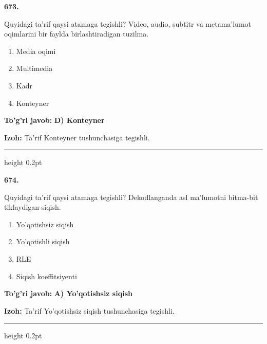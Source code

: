 \documentclass[10pt,a4paper,oneside]{article}
\begin{document}
\noindent\textbf{\color{ink}673.}
\par
Quyidagi ta'rif qaysi atamaga tegishli? Video, audio, subtitr va metama'lumot oqimlarini bir faylda birlashtiradigan tuzilma.
\begin{enumerate}[label=\Alph*),leftmargin=9mm]
\item Media oqimi
\item Multimedia
\item Kadr
\item Konteyner
\end{enumerate}
\begin{tcolorbox}[enhanced,breakable,colback=teal!4,colframe=teal!50!black,boxrule=0.5pt,arc=1.1mm,left=3mm,right=3mm,top=1.7mm,bottom=1.7mm,before skip=2mm,after skip=2mm]
\textbf{\color{teal}To'g'ri javob:} \textbf{D) Konteyner}
\par\smallskip
\textbf{Izoh:} Ta'rif Konteyner tushunchasiga tegishli.
\end{tcolorbox}
\vspace{2mm}\hrule height 0.2pt \vspace{3mm}

\noindent\textbf{\color{ink}674.}
\par
Quyidagi ta'rif qaysi atamaga tegishli? Dekodlanganda asl ma'lumotni bitma-bit tiklaydigan siqish.
\begin{enumerate}[label=\Alph*),leftmargin=9mm]
\item Yo'qotishsiz siqish
\item Yo'qotishli siqish
\item RLE
\item Siqish koeffitsiyenti
\end{enumerate}
\begin{tcolorbox}[enhanced,breakable,colback=teal!4,colframe=teal!50!black,boxrule=0.5pt,arc=1.1mm,left=3mm,right=3mm,top=1.7mm,bottom=1.7mm,before skip=2mm,after skip=2mm]
\textbf{\color{teal}To'g'ri javob:} \textbf{A) Yo'qotishsiz siqish}
\par\smallskip
\textbf{Izoh:} Ta'rif Yo'qotishsiz siqish tushunchasiga tegishli.
\end{tcolorbox}
\vspace{2mm}\hrule height 0.2pt \vspace{3mm}
\end{document}
